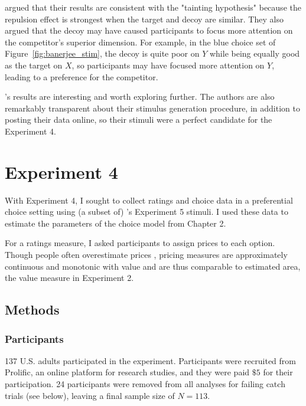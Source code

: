 \textcite{banerjeeFactorsThatPromote2024} argued that their results are consistent with the "tainting hypothesis" \parencite{simonson2014vices} because the repulsion effect is strongest when the target and decoy are similar. They also argued that the decoy may have caused participants to focus more attention on the competitor's superior dimension. For example, in the blue choice set of Figure~\ref{fig:banerjee_stim}, the decoy is quite poor on $Y$ while being equally good as the target on $X$, so participants may have focused more attention on $Y$, leading to a preference for the competitor. 

\textcite{banerjeeFactorsThatPromote2024}'s results are interesting and worth exploring further. The authors are also remarkably transparent about their stimulus generation procedure, in addition to posting their data online, so their stimuli were a perfect candidate for the Experiment 4.

\section{Experiment 4}

With Experiment 4, I sought to collect ratings and choice data in a preferential choice setting using (a subset of) \textcite{banerjeeFactorsThatPromote2024}'s Experiment 5 stimuli. I used these data to estimate the parameters of the choice model from Chapter 2. 

For a ratings measure, I asked participants to assign prices to each option. Though people often overestimate prices \parencite{breidertREVIEWMETHODSMEASURING2006}, pricing measures are approximately continuous and monotonic with value and are thus comparable to estimated area, the value measure in Experiment 2.

\subsection{Methods}

\subsubsection{Participants}
137 U.S. adults participated in the experiment. Participants were recruited from Prolific, an online platform for research studies, and they were paid $\$5$ for their participation. 24 participants were removed from all analyses for failing catch trials (see below), leaving a final sample size of $N=113$. 

